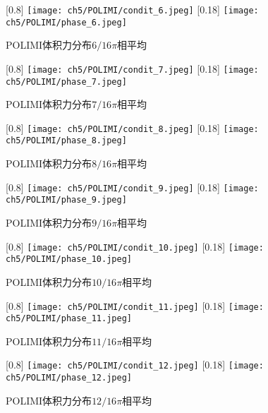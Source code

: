 \begin{figure}
  \centering
  [0.8\textwidth]
    {\texttt{[image: ch5/POLIMI/condit\_6.jpeg]}}
  [0.18\textwidth]
    {\texttt{[image: ch5/POLIMI/phase\_6.jpeg]}}
  \caption{POLIMI体积力分布$6/16\pi$相平均}
\end{figure}
\begin{figure}
  \centering
  [0.8\textwidth]
    {\texttt{[image: ch5/POLIMI/condit\_7.jpeg]}}
  [0.18\textwidth]
    {\texttt{[image: ch5/POLIMI/phase\_7.jpeg]}}
  \caption{POLIMI体积力分布$7/16\pi$相平均}
\end{figure}
\begin{figure}
  \centering
  [0.8\textwidth]
    {\texttt{[image: ch5/POLIMI/condit\_8.jpeg]}}
  [0.18\textwidth]
    {\texttt{[image: ch5/POLIMI/phase\_8.jpeg]}}
  \caption{POLIMI体积力分布$8/16\pi$相平均}
\end{figure}
\begin{figure}
  \centering
  [0.8\textwidth]
    {\texttt{[image: ch5/POLIMI/condit\_9.jpeg]}}
  [0.18\textwidth]
    {\texttt{[image: ch5/POLIMI/phase\_9.jpeg]}}
  \caption{POLIMI体积力分布$9/16\pi$相平均}
\end{figure}
\begin{figure}
  \centering
  [0.8\textwidth]
    {\texttt{[image: ch5/POLIMI/condit\_10.jpeg]}}
  [0.18\textwidth]
    {\texttt{[image: ch5/POLIMI/phase\_10.jpeg]}}
  \caption{POLIMI体积力分布$10/16\pi$相平均}
\end{figure}
\begin{figure}
  \centering
  [0.8\textwidth]
    {\texttt{[image: ch5/POLIMI/condit\_11.jpeg]}}
  [0.18\textwidth]
    {\texttt{[image: ch5/POLIMI/phase\_11.jpeg]}}
  \caption{POLIMI体积力分布$11/16\pi$相平均}
\end{figure}
\begin{figure}
  \centering
  [0.8\textwidth]
    {\texttt{[image: ch5/POLIMI/condit\_12.jpeg]}}
  [0.18\textwidth]
    {\texttt{[image: ch5/POLIMI/phase\_12.jpeg]}}
  \caption{POLIMI体积力分布$12/16\pi$相平均}
\end{figure}
